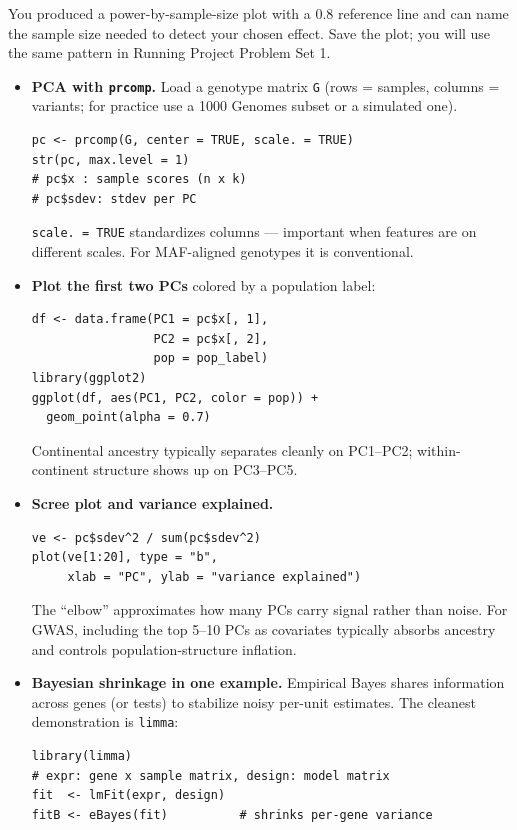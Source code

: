 \begin{winbox}[Checkpoint]
You produced a power-by-sample-size plot with a 0.8 reference line and can name the sample size needed to detect your chosen effect. Save the plot; you will use the same pattern in Running Project Problem Set 1.
\end{winbox}

\begin{itemize}[nosep]
  \item \textbf{PCA with \texttt{prcomp}.} Load a genotype matrix \texttt{G} (rows = samples, columns = variants; for practice use a 1000 Genomes subset or a simulated one).
    \begin{lstlisting}
pc <- prcomp(G, center = TRUE, scale. = TRUE)
str(pc, max.level = 1)
# pc$x : sample scores (n x k)
# pc$sdev: stdev per PC
    \end{lstlisting}
    \texttt{scale. = TRUE} standardizes columns --- important when features are on different scales. For MAF-aligned genotypes it is conventional.
  \item \textbf{Plot the first two PCs} colored by a population label:
    \begin{lstlisting}
df <- data.frame(PC1 = pc$x[, 1],
                 PC2 = pc$x[, 2],
                 pop = pop_label)
library(ggplot2)
ggplot(df, aes(PC1, PC2, color = pop)) +
  geom_point(alpha = 0.7)
    \end{lstlisting}
    Continental ancestry typically separates cleanly on PC1--PC2; within-continent structure shows up on PC3--PC5.
  \item \textbf{Scree plot and variance explained.}
    \begin{lstlisting}
ve <- pc$sdev^2 / sum(pc$sdev^2)
plot(ve[1:20], type = "b",
     xlab = "PC", ylab = "variance explained")
    \end{lstlisting}
    The ``elbow'' approximates how many PCs carry signal rather than noise. For GWAS, including the top 5--10 PCs as covariates typically absorbs ancestry and controls population-structure inflation.
  \item \textbf{Bayesian shrinkage in one example.} Empirical Bayes shares information across genes (or tests) to stabilize noisy per-unit estimates. The cleanest demonstration is \texttt{limma}:
    \begin{lstlisting}
library(limma)
# expr: gene x sample matrix, design: model matrix
fit  <- lmFit(expr, design)
fitB <- eBayes(fit)          # shrinks per-gene variance

\end{lstlisting}
\end{itemize}
